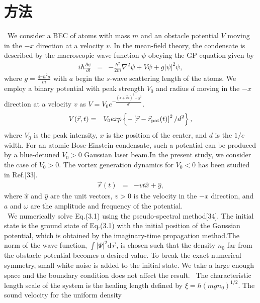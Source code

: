 \documentclass[12pt,a4paper]{jbook}
\newcommand{\diff}{\mathrm{d}}				           %
\begin{document}
\section{方法}
\ We consider a BEC of atoms with mass $m$ and an obstacle potential $V$
moving in the $-x$ direction at a velocity $v$. In the mean-field theory,
the condensate is described by the macroscopic wave function $\psi$ obeying
the GP equation given by
\begin{eqnarray}
i \hbar \frac{\partial \psi}{\partial t} & = &
- \frac{\hbar^2}{2m} \nabla^2 \psi + V \psi + g | \psi |^2 \psi,
\end{eqnarray}
where $\displaystyle g = \frac{4 \pi \hbar^2 a}{m}$ with $a$ begin the
$s$-wave scattering length of the atoms. We employ a binary potential with
peak strength $V_0$ and radius $d$ moving in the $-x$ direction
at a velocity $v$ as $V = V_0 e^{-\frac{(x+\vec{v}t)^2+y^2}{d^2}}$.
\\
\begin{eqnarray}
V( \vec{r}, t ) & = & V_0 exp
\left\{
- \left[
\vec{r} - \vec{r}_{{\rm pot}} (t)
\right]^2 /d^2
\right\},
\end{eqnarray}
where $V_0$ is the peak intensity, $x$ is the position of the center, and $d$ is the $1/e$ width.
For an atomic Bose-Einstein condensate, such a potential can be produced by a blue-detuned $V_0 > 0$
Gaussian laser beam.In the present study, we consider the case of $V_0 > 0$.
The vortex generation dynamics for $V_0 < 0$ has been studied in Ref.[33].
\begin{eqnarray}
\vec{r} (t) & = & - v t \hat{x} + \hat{y},
\end{eqnarray}
where $\hat{x}$ and $\hat{y}$ are the unit vectors, $v > 0$ is the velocity in the $-x$ direction,
and $a$ and $\omega$ are the amplitude and frequency of the potential.
\\
\ We numerically solve Eq.(3.1) using the pseudo-spectral method[34]. The initial state is the ground state
of Eq.(3.1) with the initial position of the Gaussian potential, which is obtained by the
imaginary-time propagation method.The norm of the wave function, $\int |\Psi|^2 \diff \vec{r}$, is
chosen such that the density $n_0$ far from the obstacle potential becomes a desired value.
To break the exact numerical symmetry, small white noise is added to the initial state.
We take a large enough space and the boundary condition does not affect the result.
\ The characteristic length scale of the system is the healing length defined by
$\xi = \hbar(mg n_0)^{1/2}$. The sound velocity for the uniform density
\end{document}
